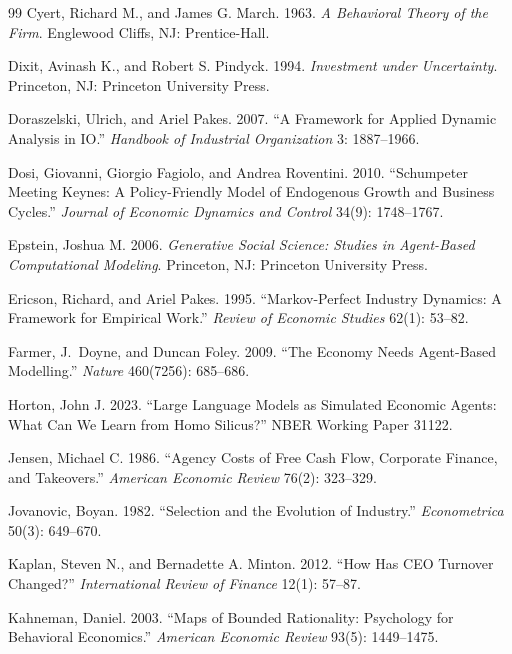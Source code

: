 \documentclass[11pt]{article}
\begin{document}
\begin{thebibliography}{99}
Cyert, Richard M., and James G. March. 1963. \textit{A Behavioral
Theory of the Firm}. Englewood Cliffs, NJ: Prentice-Hall.

Dixit, Avinash K., and Robert S. Pindyck. 1994. \textit{Investment
under Uncertainty}. Princeton, NJ: Princeton University Press.

Doraszelski, Ulrich, and Ariel Pakes. 2007. ``A Framework for Applied
Dynamic Analysis in IO.'' \textit{Handbook of Industrial Organization}
3: 1887--1966.

Dosi, Giovanni, Giorgio Fagiolo, and Andrea Roventini. 2010.
``Schumpeter Meeting Keynes: A Policy-Friendly Model of Endogenous
Growth and Business Cycles.'' \textit{Journal of Economic Dynamics
and Control} 34(9): 1748--1767.

Epstein, Joshua M. 2006. \textit{Generative Social Science: Studies in
Agent-Based Computational Modeling}. Princeton, NJ: Princeton
University Press.

Ericson, Richard, and Ariel Pakes. 1995. ``Markov-Perfect Industry
Dynamics: A Framework for Empirical Work.'' \textit{Review of Economic
Studies} 62(1): 53--82.

Farmer, J.~Doyne, and Duncan Foley. 2009. ``The Economy Needs
Agent-Based Modelling.'' \textit{Nature} 460(7256): 685--686.

Horton, John J. 2023. ``Large Language Models as Simulated Economic
Agents: What Can We Learn from Homo Silicus?'' NBER Working Paper
31122.

Jensen, Michael C. 1986. ``Agency Costs of Free Cash Flow, Corporate
Finance, and Takeovers.'' \textit{American Economic Review} 76(2):
323--329.

Jovanovic, Boyan. 1982. ``Selection and the Evolution of Industry.''
\textit{Econometrica} 50(3): 649--670.

Kaplan, Steven N., and Bernadette A. Minton. 2012. ``How Has CEO
Turnover Changed?'' \textit{International Review of Finance} 12(1):
57--87.

Kahneman, Daniel. 2003. ``Maps of Bounded Rationality: Psychology
for Behavioral Economics.'' \textit{American Economic Review} 93(5):
1449--1475.


\end{thebibliography}
\end{document}
